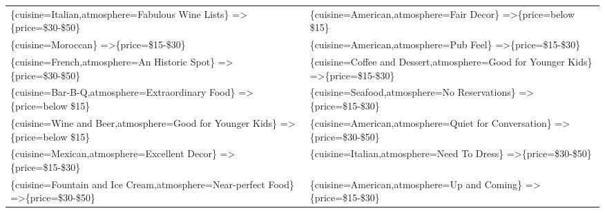 \documentclass[letterpaper,10pt]{article}
\begin{document}
\begin{appendices}
\begin{table}[h]
\begin{adjustbox}{max width=\textwidth}
\begin{tabular}{ll}
\{cuisine=Italian,atmosphere=Fabulous Wine Lists\} =\textgreater \{price=\$30-\$50\} & \{cuisine=American,atmosphere=Fair Decor\} =\textgreater \{price=below \$15\} \\
\{cuisine=Moroccan\} =\textgreater \{price=\$15-\$30\} & \{cuisine=American,atmosphere=Pub Feel\} =\textgreater \{price=\$15-\$30\} \\
\{cuisine=French,atmosphere=An Historic Spot\} =\textgreater \{price=\$30-\$50\} & \{cuisine=Coffee and Dessert,atmosphere=Good for Younger Kids\} =\textgreater \{price=\$15-\$30\} \\
\{cuisine=Bar-B-Q,atmosphere=Extraordinary Food\} =\textgreater \{price=below \$15\} & \{cuisine=Seafood,atmosphere=No Reservations\} =\textgreater \{price=\$15-\$30\} \\
\{cuisine=Wine and Beer,atmosphere=Good for Younger Kids\} =\textgreater \{price=below \$15\} & \{cuisine=American,atmosphere=Quiet for Conversation\} =\textgreater \{price=\$30-\$50\} \\
\{cuisine=Mexican,atmosphere=Excellent Decor\} =\textgreater \{price=\$15-\$30\} & \{cuisine=Italian,atmosphere=Need To Dress\} =\textgreater \{price=\$30-\$50\} \\
\{cuisine=Fountain and Ice Cream,atmosphere=Near-perfect Food\} =\textgreater \{price=\$30-\$50\} & \{cuisine=American,atmosphere=Up and Coming\} =\textgreater \{price=\$15-\$30\} \\
\end{tabular}
\end{adjustbox}
\end{table}
\clearpage
\newpage

\end{appendices}
\end{document}
